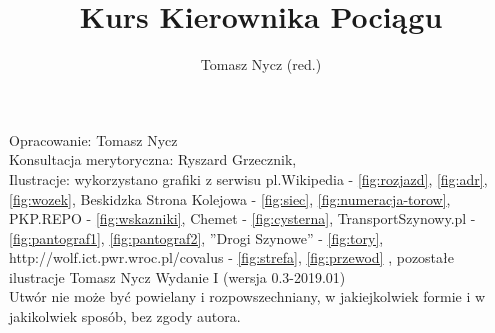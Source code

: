 \documentclass[usenames,dvipsnames,svgnames,table,a4paper,openany,justified]{tufte-book}
\author{Tomasz Nycz (red.)}
\title{Kurs Kierownika Pociągu}
\begin{document}
	\setlength{\parindent}{1cm} %
\restoregeometry %
\nopagecolor%

Opracowanie: Tomasz Nycz\\
Konsultacja merytoryczna: Ryszard Grzecznik, \\
Ilustracje: wykorzystano grafiki z serwisu pl.Wikipedia - \ref{fig:rozjazd}, \ref{fig:adr}, \ref{fig:wozek}, Beskidzka Strona Kolejowa  - \ref{fig:siec}, \ref{fig:numeracja-torow}, PKP.REPO - \ref{fig:wskazniki}, Chemet - \ref{fig:cysterna}, TransportSzynowy.pl - \ref{fig:pantograf1}, \ref{fig:pantograf2}, ''Drogi Szynowe'' - \ref{fig:tory}, http://wolf.ict.pwr.wroc.pl/covalus - \ref{fig:strefa}, \ref{fig:przewod} , pozostałe ilustracje Tomasz Nycz
\vfill
Wydanie I (wersja 0.3-2019.01)\\
Utwór nie może być powielany i rozpowszechniany, w jakiejkolwiek formie
i w jakikolwiek sposób, bez zgody autora. 
\end{document}
